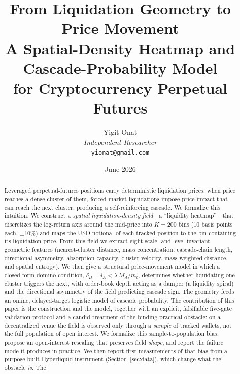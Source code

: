 \documentclass[11pt,a4paper]{article}
\theoremstyle{definition}
\theoremstyle{plain}
\begin{document}
\title{\textbf{From Liquidation Geometry to Price Movement}\\[4pt]
\large A Spatial-Density Heatmap and Cascade-Probability Model\\
for Cryptocurrency Perpetual Futures}

\author{Yigit Onat\\
\textit{Independent Researcher}\\
\texttt{yionat@gmail.com}}
\date{June 2026}
\maketitle

\begin{abstract}
Leveraged perpetual-futures positions carry deterministic liquidation prices; when price reaches a
dense cluster of them, forced market liquidations impose price impact that can reach the next
cluster, producing a self-reinforcing cascade. We formalize this intuition. We construct a
\emph{spatial liquidation-density field}---a ``liquidity heatmap''---that discretizes the
log-return axis around the mid-price into $K=200$ bins ($10$ basis points each, $\pm 10\%$) and
maps the USD notional of each tracked position to the bin containing its liquidation price. From
this field we extract eight scale- and level-invariant geometric features (nearest-cluster
distance, mass concentration, cascade-chain length, directional asymmetry, absorption capacity,
cluster velocity, mass-weighted distance, and spatial entropy). We then give a structural
price-movement model in which a closed-form domino condition,
$\delta_B-\delta_A < \lambda\,M_A/m_t$, determines whether liquidating one cluster triggers the
next, with order-book depth acting as a damper (a liquidity spiral) and the directional asymmetry
of the field predicting cascade sign. The geometry feeds an online, delayed-target logistic model
of cascade probability. The contribution of this paper is the construction and the model, together
with an explicit, falsifiable five-gate validation protocol and a candid treatment of the binding
practical obstacle: on a decentralized venue the field is observed only through a \emph{sample} of
tracked wallets, not the full population of open interest. We formalize this sample-to-population
bias, propose an open-interest rescaling that preserves field \emph{shape}, and report the failure
mode it produces in practice. We then report first measurements of that bias from a purpose-built
Hyperliquid instrument (Section~\ref{sec:data}), which change what the obstacle \emph{is}. The

\end{abstract}
\end{document}
